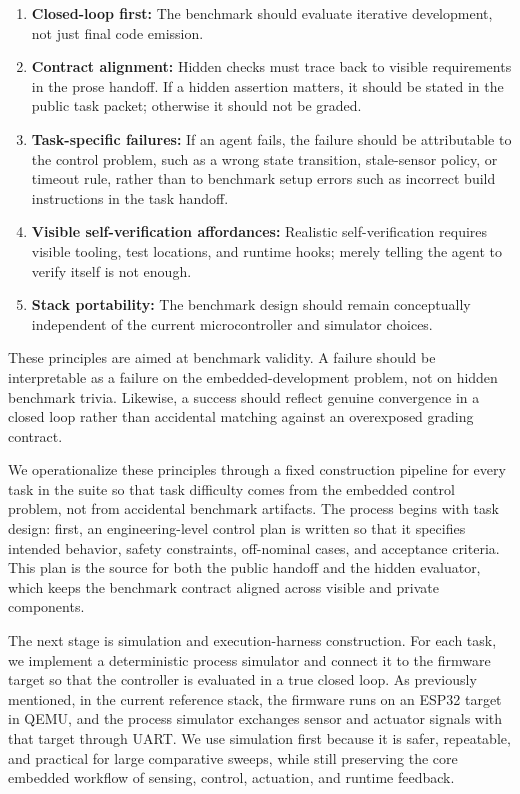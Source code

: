 \documentclass[a4paper,fleqn]{cas-dc}
\begin{document}
\begin{enumerate}
    \item \textbf{Closed-loop first:} The benchmark should evaluate iterative development, not just final code emission.
    \item \textbf{Contract alignment:} Hidden checks must trace back to visible requirements in the prose handoff. If a hidden assertion matters, it should be stated in the public task packet; otherwise it should not be graded.
    \item \textbf{Task-specific failures:} If an agent fails, the failure should be attributable to the control problem, such as a wrong state transition, stale-sensor policy, or timeout rule, rather than to benchmark setup errors such as incorrect build instructions in the task handoff.
    \item \textbf{Visible self-verification affordances:} Realistic self-verification requires visible tooling, test locations, and runtime hooks; merely telling the agent to verify itself is not enough.
    \item \textbf{Stack portability:} The benchmark design should remain conceptually independent of the current microcontroller and simulator choices.
\end{enumerate}

These principles are aimed at benchmark validity. A failure should be interpretable as a failure on the embedded-development problem, not on hidden benchmark trivia. Likewise, a success should reflect genuine convergence in a closed loop rather than accidental matching against an overexposed grading contract.

We operationalize these principles through a fixed construction pipeline for every task in the suite so that task difficulty comes from the embedded control problem, not from accidental benchmark artifacts. The process begins with task design: first, an engineering-level control plan is written so that it specifies intended behavior, safety constraints, off-nominal cases, and acceptance criteria. This plan is the source for both the public handoff and the hidden evaluator, which keeps the benchmark contract aligned across visible and private components.

The next stage is simulation and execution-harness construction. For each task, we implement a deterministic process simulator and connect it to the firmware target so that the controller is evaluated in a true closed loop. As previously mentioned, in the current reference stack, the firmware runs on an ESP32 target in QEMU, and the process simulator exchanges sensor and actuator signals with that target through UART. We use simulation first because it is safer, repeatable, and practical for large comparative sweeps, while still preserving the core embedded workflow of sensing, control, actuation, and runtime feedback.
\end{document}
